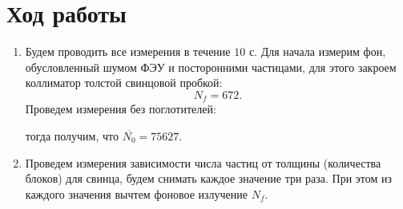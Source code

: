 \documentclass[a4paper,12pt]{article}
\theoremstyle{plain} %
\theoremstyle{definition} %
\theoremstyle{remark} %
\begin{document}
\section{Ход работы}

\begin{enumerate}
    \item Будем проводить все измерения в течение $10$ с. Для начала измерим фон, обусловленный шумом ФЭУ и посторонними частицами, для этого закроем коллиматор толстой свинцовой пробкой:
    \[N_f = 672.\]
    Проведем измерения без поглотителей:
    \begin{table}[h]
    \caption{Показания счетчика в остутствие поглотителей}
\end{table}
    тогда получим, что $\overline{N_0} = 75627.$
    \item Проведем измерения зависимости числа частиц от толщины (количества блоков) для свинца, будем снимать каждое значение три раза. При этом из каждого значения вычтем фоновое излучение $N_f.$
    
\begin{table}[H]
\caption{Зависимость числа частиц, попадающих на счетчик, от толщины поглотителя из свинца}
\end{table}


\end{enumerate}
\end{document}

